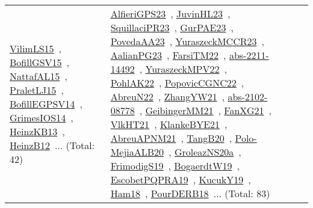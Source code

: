 {\begin{longtable}{lp{3cm}>{\raggedright\arraybackslash}p{6cm}>{\raggedright\arraybackslash}p{6cm}>{\raggedright\arraybackslash}p{8cm}}
\href{works/VilimLS15.pdf}{VilimLS15}~\cite{VilimLS15}, \href{works/BofillGSV15.pdf}{BofillGSV15}~\cite{BofillGSV15}, \href{works/NattafAL15.pdf}{NattafAL15}~\cite{NattafAL15}, \href{works/PraletLJ15.pdf}{PraletLJ15}~\cite{PraletLJ15}, \href{works/BofillEGPSV14.pdf}{BofillEGPSV14}~\cite{BofillEGPSV14}, \href{works/GrimesIOS14.pdf}{GrimesIOS14}~\cite{GrimesIOS14}, \href{works/HeinzKB13.pdf}{HeinzKB13}~\cite{HeinzKB13}, \href{works/HeinzB12.pdf}{HeinzB12}~\cite{HeinzB12}... (Total: 42) & \href{works/AlfieriGPS23.pdf}{AlfieriGPS23}~\cite{AlfieriGPS23}, \href{works/JuvinHL23.pdf}{JuvinHL23}~\cite{JuvinHL23}, \href{works/SquillaciPR23.pdf}{SquillaciPR23}~\cite{SquillaciPR23}, \href{works/GurPAE23.pdf}{GurPAE23}~\cite{GurPAE23}, \href{works/PovedaAA23.pdf}{PovedaAA23}~\cite{PovedaAA23}, \href{works/YuraszeckMCCR23.pdf}{YuraszeckMCCR23}~\cite{YuraszeckMCCR23}, \href{works/AalianPG23.pdf}{AalianPG23}~\cite{AalianPG23}, \href{works/FarsiTM22.pdf}{FarsiTM22}~\cite{FarsiTM22}, \href{works/abs-2211-14492.pdf}{abs-2211-14492}~\cite{abs-2211-14492}, \href{works/YuraszeckMPV22.pdf}{YuraszeckMPV22}~\cite{YuraszeckMPV22}, \href{works/PohlAK22.pdf}{PohlAK22}~\cite{PohlAK22}, \href{works/PopovicCGNC22.pdf}{PopovicCGNC22}~\cite{PopovicCGNC22}, \href{works/AbreuN22.pdf}{AbreuN22}~\cite{AbreuN22}, \href{works/ZhangYW21.pdf}{ZhangYW21}~\cite{ZhangYW21}, \href{works/abs-2102-08778.pdf}{abs-2102-08778}~\cite{abs-2102-08778}, \href{works/GeibingerMM21.pdf}{GeibingerMM21}~\cite{GeibingerMM21}, \href{works/FanXG21.pdf}{FanXG21}~\cite{FanXG21}, \href{works/VlkHT21.pdf}{VlkHT21}~\cite{VlkHT21}, \href{works/KlankeBYE21.pdf}{KlankeBYE21}~\cite{KlankeBYE21}, \href{works/AbreuAPNM21.pdf}{AbreuAPNM21}~\cite{AbreuAPNM21}, \href{works/TangB20.pdf}{TangB20}~\cite{TangB20}, \href{works/Polo-MejiaALB20.pdf}{Polo-MejiaALB20}~\cite{Polo-MejiaALB20}, \href{works/GroleazNS20a.pdf}{GroleazNS20a}~\cite{GroleazNS20a}, \href{works/FrimodigS19.pdf}{FrimodigS19}~\cite{FrimodigS19}, \href{works/BogaerdtW19.pdf}{BogaerdtW19}~\cite{BogaerdtW19}, \href{works/EscobetPQPRA19.pdf}{EscobetPQPRA19}~\cite{EscobetPQPRA19}, \href{works/KucukY19.pdf}{KucukY19}~\cite{KucukY19}, \href{works/Ham18.pdf}{Ham18}~\cite{Ham18}, \href{works/PourDERB18.pdf}{PourDERB18}~\cite{PourDERB18}... (Total: 83)\\

\end{longtable}}
